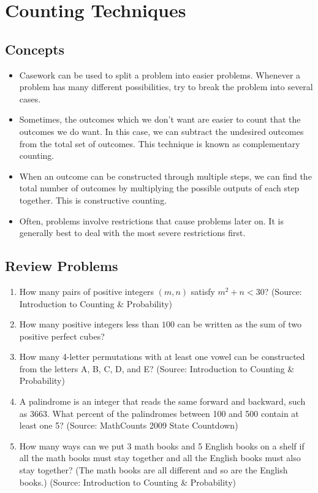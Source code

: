 \documentclass[12pt, letterpaper]{article}
\begin{document}
\setcounter{section}{1}
\section{Counting Techniques}

\subsection{Concepts}

\begin{itemize}
    \item Casework can be used to split a problem into easier problems. Whenever a problem has many different possibilities, try to break the problem into several cases.
    \item Sometimes, the outcomes which we don't want are easier to count that the outcomes we do want. In this case, we can subtract the undesired outcomes from the total set of outcomes. This technique is known as complementary counting.
    \item When an outcome can be constructed through multiple steps, we can find the total number of outcomes by multiplying the possible outputs of each step together. This is constructive counting.
    \item Often, problems involve restrictions that cause problems later on. It is generally best to deal with the most severe restrictions first.
\end{itemize}

\subsection{Review Problems}

\begin{enumerate}
    \item How many pairs of positive integers $(m, n)$ satisfy $m^2 + n < 30$? (Source: Introduction to Counting \& Probability)
    \item How many positive integers less than $100$ can be written as the sum of two positive perfect cubes?
    \item How many 4-letter permutations with at least one vowel can be constructed from the letters A, B, C, D, and E? (Source: Introduction to Counting \& Probability)
    \item A palindrome is an integer that reads the same forward and backward, such as 3663. What percent of the palindromes between 100 and 500 contain at least one 5? (Source: MathCounts 2009 State Countdown)
    \item How many ways can we put 3 math books and 5 English books on a shelf if all the math books must stay together and all the English books must also stay together? (The math books are all different and so are the English books.) (Source: Introduction to Counting \& Probability)
\end{enumerate}
\end{document}
